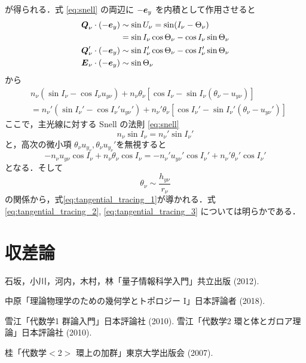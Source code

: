 \documentclass{jsarticle}
\begin{document}
が得られる．式 \eqref{eq:snell} の両辺に $-\vb*{e}_y$ を内積として作用させると
\begin{align}
    &\begin{aligned}
        \vb*{Q}_\nu\cdot(-\vb*{e}_y)&\sim\sin U_\nu=\sin (I_\nu-\Theta_\nu)\\
        &=\sin I_\nu \cos \Theta_\nu - \cos I_\nu \sin \Theta_\nu
    \end{aligned}\\
    &\vb*{Q}_\nu'\cdot(-\vb*{e}_y)\sim \sin I_\nu' \cos \Theta_\nu - \cos I_\nu' \sin \Theta_\nu\\
    &\vb*{E}_\nu\cdot(-\vb*{e}_y)\sim\sin \Theta_\nu
\end{align}
から
\begin{equation}
    \begin{aligned}
        &n_\nu(\sin I_\nu-\cos I_\nu u_{y\nu})+n_\nu\theta_\nu[\cos I_\nu -\sin I_\nu (\theta_\nu-u_{y\nu})]\\
        &=n_\nu'(\sin I_\nu'-\cos I_\nu' u_{y\nu}')+n_\nu'\theta_\nu[\cos I_\nu' -\sin I_\nu' (\theta_\nu-u_{y\nu}')]
    \end{aligned}
\end{equation}
ここで，主光線に対する Snell の法則 \eqref{eq:snell}
\begin{equation}
    n_\nu\sin I_\nu=n_\nu'\sin I_\nu'
\end{equation}
と，高次の微小項 $\theta_\nu u_{y_\nu}, \theta_\nu u_{y_\nu}'$を無視すると
\begin{equation}
    -n_\nu u_{y\nu}\cos I_\nu + n_\nu\theta_\nu\cos I_\nu
    =-n_\nu' u_{y\nu}'\cos I_\nu' + n_\nu'\theta_\nu'\cos I_\nu'
\end{equation}
となる．そして
\begin{equation}
    \theta_\nu\sim \frac{h_{y\nu}}{r_\nu}
\end{equation}
の関係から，式\eqref{eq:tangential_tracing_1}が導かれる．式 \eqref{eq:tangential_tracing_2}, \eqref{eq:tangential_tracing_3} については明らかである．

\section{収差論}
\label{sec:abberation_theory}

\begin{thebibliography}{99}
石坂，小川，河内，木村，林「量子情報科学入門」共立出版 (2012).

中原「理論物理学のための幾何学とトポロジー I」日本評論者 (2018).

雪江「代数学1 群論入門」日本評論社 (2010).
雪江「代数学2 環と体とガロア理論」日本評論社 (2010).


桂「代数学$<$2$>$ 環上の加群」東京大学出版会 (2007).
\end{thebibliography}
\end{document}
